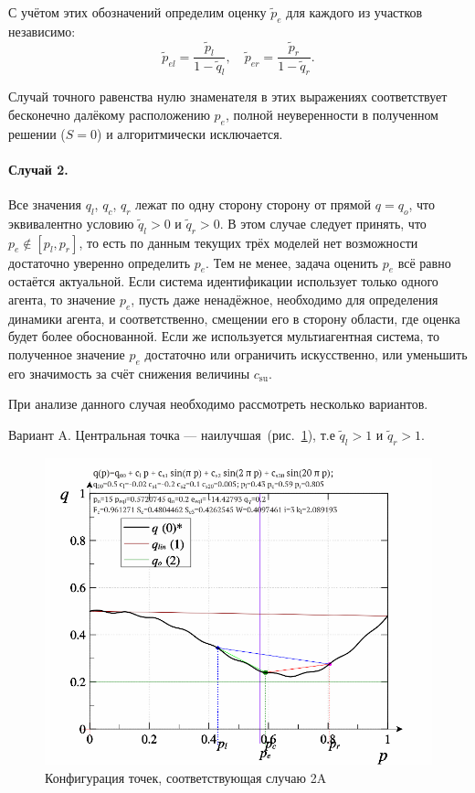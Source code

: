 С учётом этих обозначений определим оценку $\tilde{p}_e$
для каждого из участков независимо:
%
\begin{equation}
  \tilde{p}_{el} = \frac{\tilde{p}_l}{1-\tilde{q}_l},
  \quad
  \tilde{p}_{er} = \frac{\tilde{p}_r}{1-\tilde{q}_r}.
  \label{atu:eq:pr_ex}
\end{equation}

Случай точного равенства нулю знаменателя в этих выражениях соответствует
бесконечно далёкому расположению $p_e$, полной неуверенности в полученном решении
($S = 0$) и алгоритмически исключается.


\paragraph{Случай 2.} %
Все значения $q_l$, $q_c$, $q_r$ лежат по одну сторону
сторону от прямой $q=q_o$,
что эквивалентно условию $\tilde{q}_l > 0  $ и $\tilde{q}_r > 0  $.
В этом случае следует принять,
что $p_e \notin [p_l, p_r]$, то есть по данным текущих трёх моделей
нет возможности достаточно уверенно определить $p_e$. Тем не менее,
задача оценить $p_e$ всё равно остаётся актуальной.
Если система идентификации использует только одного агента,
то значение $p_e$, пусть даже ненадёжное, необходимо для
определения динамики агента, и соответственно, смещении
его в сторону области, где оценка будет более обоснованной.
Если же используется мультиагентная система,
то полученное значение $p_e$ достаточно или ограничить искусственно,
или уменьшить его значимость за счёт снижения величины $c_\mathrm{su}$.

При анализе данного случая необходимо рассмотреть несколько
вариантов.

Вариант A.\label{atu:d:p_eql_2A} %
Центральная точка --- наилучшая~(рис.~\ref{atu:f:pq_2A}),
т.е $\tilde{q}_l > 1 $ и $\tilde{q}_r > 1  $.

\begin{figure}[htb!]
  \centerline{\includegraphics[width=60\TW]{p/pq_sin-p_pq_cgood.png} }
  \caption{Конфигурация точек, соответствующая случаю 2A}
  \label{atu:f:pq_2A}
\end{figure}

